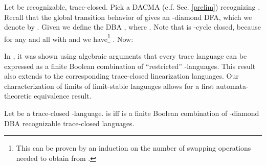 Let  be recognizable, trace-closed. Pick a DACMA (c.f. Sec. \ref{prelim})  recognizing . Recall that the global transition behavior of  gives an -diamond DFA, which we denote by . Given  we define the DBA , where . Note that  is -cycle closed, because for any  and all  with  and  we have\footnote{This can be proven by an induction on the number of swapping operations needed to obtain  from .} .  Now: 


In \cite{DM93}, it was shown using algebraic arguments that every \omReg trace language can be expressed as a finite Boolean combination of ``restricted'' -languages. This result also extends to the corresponding trace-closed linearization languages. Our characterization of limits of limit-stable languages allows for a first automata-theoretic equivalence result.

\begin{theorem}
Let  be a trace-closed -language.  is \omReg iff  is a finite Boolean combination of -diamond DBA recognizable trace-closed languages.
\end{theorem}